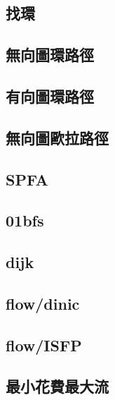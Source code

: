 \documentclass[a4paper,10pt,twocolumn,oneside]{article}
\begin{document}
    \subsection{找環}
    

    \subsection{無向圖環路徑}
    

    \subsection{有向圖環路徑}
    

    \subsection{無向圖歐拉路徑}
    

    \subsection{SPFA}
    

    \subsection{01bfs}
    

    \subsection{dijk}
    

    \subsection{flow/dinic}
    

    \subsection{flow/ISFP}
    

    \subsection{最小花費最大流}
    
\end{document}
